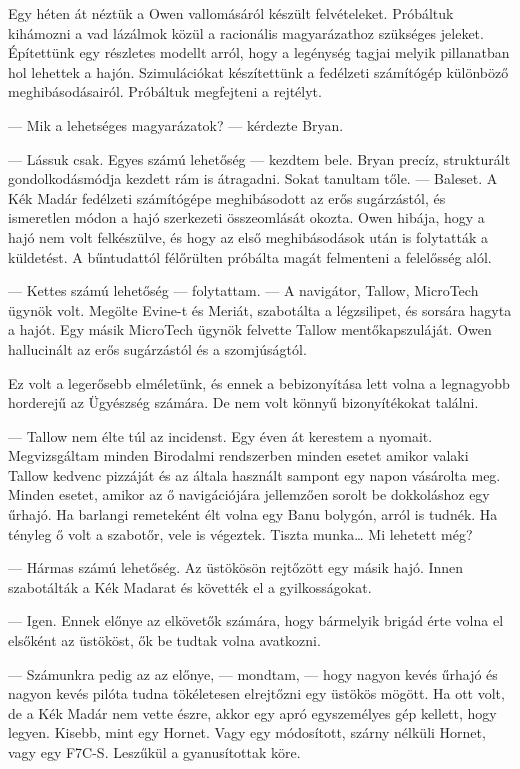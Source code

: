 \documentclass[10pt]{memoir}
\begin{document}
Egy héten át néztük a Owen vallomásáról készült felvételeket. Próbáltuk
kihámozni a vad lázálmok közül a racionális magyarázathoz szükséges jeleket.
Építettünk egy részletes modellt arról, hogy a legénység tagjai melyik
pillanatban hol lehettek a hajón. Szimulációkat készítettünk a fedélzeti
számítógép különböző meghibásodásairól. Próbáltuk megfejteni a rejtélyt.

— Mik a lehetséges magyarázatok? — kérdezte Bryan.

— Lássuk csak. Egyes számú lehetőség — kezdtem bele. Bryan precíz, strukturált
gondolkodásmódja kezdett rám is átragadni. Sokat tanultam tőle. — Baleset. A
Kék Madár fedélzeti számítógépe meghibásodott az erős sugárzástól, és
ismeretlen módon a hajó szerkezeti összeomlását okozta. Owen hibája, hogy a
hajó nem volt felkészülve, és hogy az első meghibásodások után is folytatták a
küldetést. A bűntudattól félőrülten próbálta magát felmenteni a felelősség
alól.

— Kettes számú lehetőség — folytattam. — A navigátor, Tallow, MicroTech ügynök
volt. Megölte Evine-t és Meriát, szabotálta a légzsilipet, és sorsára hagyta a
hajót. Egy másik MicroTech ügynök felvette Tallow mentőkapszuláját. Owen
hallucinált az erős sugárzástól és a szomjúságtól.

Ez volt a legerősebb elméletünk, és ennek a bebizonyítása lett volna a
legnagyobb horderejű az Ügyészség számára. De nem volt könnyű bizonyítékokat
találni.

— Tallow nem élte túl az incidenst. Egy éven át kerestem a nyomait.
Megvizsgáltam minden Birodalmi rendszerben minden esetet amikor valaki Tallow
kedvenc pizzáját és az általa használt sampont egy napon vásárolta meg. Minden
esetet, amikor az ő navigációjára jellemzően sorolt be dokkoláshoz egy űrhajó.
Ha barlangi remeteként élt volna egy Banu bolygón, arról is tudnék. Ha tényleg
ő volt a szabotőr, vele is végeztek. Tiszta munka… Mi lehetett még?

— Hármas számú lehetőség. Az üstökösön rejtőzött egy másik hajó. Innen
szabotálták a Kék Madarat és követték el a gyilkosságokat.

— Igen. Ennek előnye az elkövetők számára, hogy bármelyik brigád érte volna el
elsőként az üstököst, ők be tudtak volna avatkozni.

— Számunkra pedig az az előnye, — mondtam, — hogy nagyon kevés űrhajó és nagyon
kevés pilóta tudna tökéletesen elrejtőzni egy üstökös mögött. Ha ott volt, de a
Kék Madár nem vette észre, akkor egy apró egyszemélyes gép kellett, hogy
legyen. Kisebb, mint egy Hornet. Vagy egy módosított, szárny nélküli Hornet,
vagy egy F7C-S. Leszűkül a gyanusítottak köre.
\end{document}
